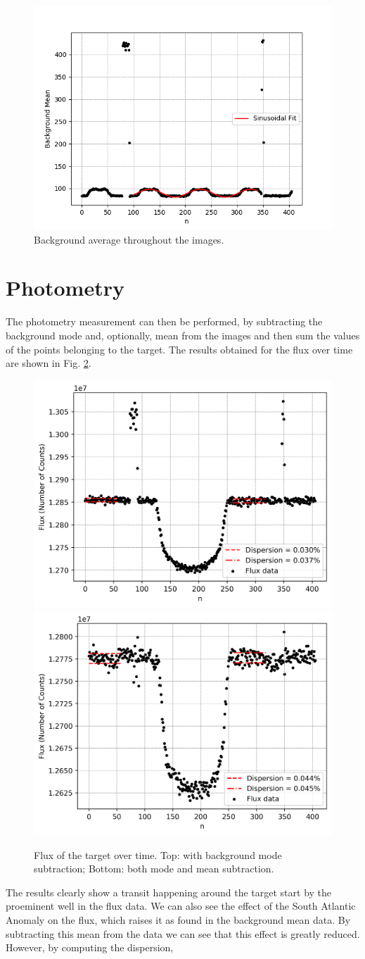 \documentclass{aa}
\begin{document}
\begin{figure}
\centering

\includegraphics[width=.4\textwidth]{background_avg.png}

\caption{Background average throughout the images.}
\label{fig:mean}
\end{figure}

\section{Photometry}

The photometry measurement can then be performed, by subtracting the background mode and, optionally, mean from the images and then sum the values of the points belonging to the target. The results obtained for the flux over time are shown in Fig. \ref{fig:flux}.

\begin{figure}
\centering
\includegraphics[width=.4\textwidth]{flux.png}
\includegraphics[width=.4\textwidth]{flux_no_avg.png}
\caption{Flux of the target over time. Top: with background mode subtraction; Bottom: both mode and mean subtraction.}
\label{fig:flux}
\end{figure}

The results clearly show a transit happening around the target start by the proeminent well in the flux data. We can also see the effect of the South Atlantic Anomaly on the flux, which raises it as found in the background mean data. By subtracting this mean from the data we can see that this effect is greatly reduced. However, by computing the dispersion,
\end{document}
